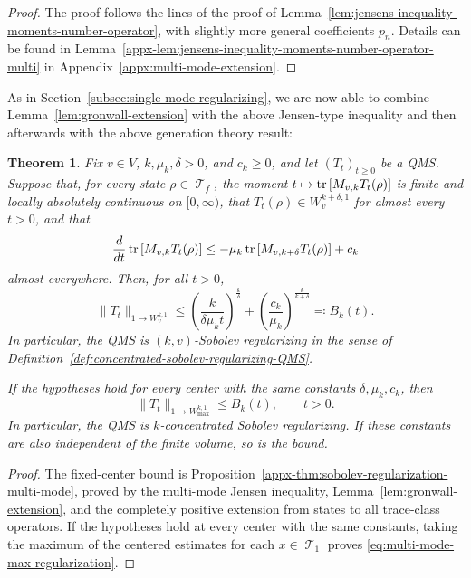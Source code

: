 \documentclass[11pt]{article}
\theoremstyle{myplain}
\newtheorem{thm}{Theorem}[section]
\theoremstyle{mydefinition}
\theoremstyle{remark}
\DeclareMathOperator{\cT}{\mathcal{T}}
\DeclareMathOperator{\1}{\mathds{1}}
\newcommand{\tr}[1][]{\operatorname{tr}%
  \ifx#1\empty \else \left[ #1 \right] \fi}
\begin{document}
        \begin{proof}
            The proof follows the lines of the proof of Lemma~\ref{lem:jensens-inequality-moments-number-operator}, with slightly more general coefficients $p_n$. Details can be found in Lemma~\ref{appx-lem:jensens-inequality-moments-number-operator-multi} in Appendix~\ref{appx:multi-mode-extension}.
        \end{proof}

        As in Section~\ref{subsec:single-mode-regularizing}, we are now able to combine Lemma~\ref{lem:gronwall-extension} with the above Jensen-type inequality and then afterwards with the above generation theory result:

        
        \begin{thm}\label{thm:sobolev-regularization-multi-mode}
            Fix $v \in V$, $k,\mu_k,\delta > 0$, and $c_k \geq 0$, and let $(T_t)_{t \geq 0}$ be a QMS. Suppose that, for every state $\rho \in \cT_f$, the moment $t \mapsto \tr[M_{v,k}T_t(\rho)]$ is finite and locally absolutely continuous on $[0,\infty)$, that $T_t(\rho) \in W_v^{k+\delta,1}$ for almost every $t > 0$, and that
            \begin{equation}\label{eq:assum-improved-stability-multi-mode}
                \frac{d}{dt} \tr[M_{v,k}T_t(\rho)]
                \leq -\mu_k \tr[M_{v,k+\delta}T_t(\rho)] + c_k
            \end{equation}
            almost everywhere. Then, for all $t > 0$,
            \begin{equation}\label{eq:quantitative-concentrated-regularization}
                \|T_t\|_{1 \to W_v^{k,1}}
                \leq \left( \frac{k}{\delta \mu_k t} \right)^{\frac{k}{\delta}}
                + \left( \frac{c_k}{\mu_k} \right)^{\frac{k}{k+\delta}}
                \eqqcolon B_k(t).
            \end{equation}
            In particular, the QMS is $(k,v)$-Sobolev regularizing in the sense of Definition~\ref{def:concentrated-sobolev-regularizing-QMS}.

            If the hypotheses hold for every center with the same constants $\delta,\mu_k,c_k$, then
            \begin{equation}\label{eq:multi-mode-max-regularization}
                \|T_t\|_{1 \to W_{\max}^{k,1}} \leq B_k(t),\qquad t > 0.
            \end{equation}
            In particular, the QMS is $k$-concentrated Sobolev regularizing. If these constants are also independent of the finite volume, so is the bound.
        \end{thm}
        \begin{proof}
            The fixed-center bound is Proposition~\ref{appx-thm:sobolev-regularization-multi-mode}, proved by the multi-mode Jensen inequality, Lemma~\ref{lem:gronwall-extension}, and the completely positive extension from states to all trace-class operators. If the hypotheses hold at every center with the same constants, taking the maximum of the centered estimates for each $x \in \cT_1$ proves \eqref{eq:multi-mode-max-regularization}.
        \end{proof}
\end{document}
